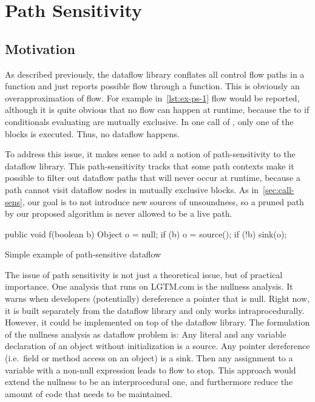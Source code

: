 \section{Path Sensitivity}
\subsection{Motivation}

As described previously, the dataflow library conflates all control flow paths 
in a function and just reports possible flow through a function.
This is obviously an overapproximation of flow.
For example in~\autoref{lst:ex-ps-1} flow would be reported,
although it is quite obvious that no flow can happen at runtime,
because the to if conditionals evaluating  are mutually exclusive.
In one call of , only one of the blocks is executed.
Thus, no dataflow happens.

To address this issue,
it makes sense to add a notion of path-sensitivity to the dataflow library.
This path-sensitivity tracks that some path contexts make it possible to 
filter out dataflow paths that will never occur at runtime,
because a path cannot visit dataflow nodes in mutually exclusive blocks.
As in~\autoref{sec:call-sens}, our goal is to not introduce new sources of 
unsoundness, so a pruned path by our proposed algorithm
is never allowed to be a live path.

\begin{listing}[h]
    \begin{javacode}
public void f(boolean b) {
    Object o = null;
    if (b) {
        o = source();
    }
    if (!b) {
        sink(o);
    }
}
    \end{javacode}
    \caption{Simple example of path-sensitive dataflow}
    \label{lst:ex-ps-1}
\end{listing}

The issue of path sensitivity is not just a theoretical issue, but of practical importance.
One analysis that runs on LGTM.com is the nullness analysis.
It warns when developers (potentially) dereference a pointer that is null.
Right now, it is built separately from the dataflow library and only works 
intraprocedurally.
However, it could be implemented on top of the dataflow library.
The formulation of the nullness analysis as dataflow problem is:
Any literal  and any variable declaration of an object 
without initialization is a source.
Any pointer dereference (i.e.\ field or method access on an object) is a sink.
Then any assignment to a variable with a non-null expression leads to flow to stop.
This approach would extend the nullness to be an interprocedural one, and furthermore 
reduce the amount of code that needs to be maintained.

